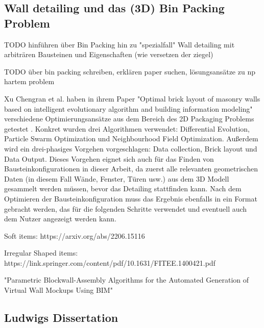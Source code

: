 \subsection{Wall detailing und das (3D) Bin Packing Problem}
\label{basics:wall-detailing}
TODO hinführen über Bin Packing hin zu "spezialfall" Wall detailing mit arbiträren Bausteinen und Eigenschaften (wie versetzen der ziegel)

TODO über bin packing schreiben, erklären paper suchen, lösungsansätze zu np hartem problem 

Xu Chengran et al. haben in ihrem Paper "Optimal brick layout of masonry walls based on intelligent evolutionary algorithm and building information modeling" verschiedene Optimierungsansätze aus dem Bereich des 2D Packaging Problems getestet \cite{Xu2021}.
Konkret wurden drei Algorithmen verwendet: Differential Evolution, Particle Swarm Optimization und Neighbourhood Field Optimization.
Außerdem wird ein drei-phasiges Vorgehen vorgeschlagen: Data collection, Brick layout und Data Output.
Dieses Vorgehen eignet sich auch für das Finden von Bausteinkonfigurationen in dieser Arbeit, da zuerst alle relevanten geometrischen Daten (in diesem Fall Wände, Fenster, Türen usw.) aus dem 3D Modell gesammelt werden müssen, bevor das Detailing stattfinden kann.
Nach dem Optimieren der Bausteinkonfiguration muss das Ergebnis ebenfalls in ein Format gebracht werden, das für die folgenden Schritte verwendet und eventuell auch dem Nutzer angezeigt werden kann.


Soft items: https://arxiv.org/abs/2206.15116

Irregular Shaped items: https://link.springer.com/content/pdf/10.1631/FITEE.1400421.pdf

"Parametric Blockwall-Assembly Algorithms for the Automated Generation of Virtual Wall Mockups Using BIM"
\subsection{Ludwigs Dissertation}
\label{related:ludwigs dis}


